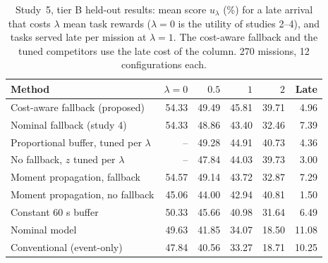 \begin{table}[t]
\caption{Study~5, tier B held-out results: mean score $u_\lambda$ (\%) for a late arrival that costs $\lambda$ mean task rewards ($\lambda = 0$ is the utility of studies 2--4), and tasks served late per mission at $\lambda = 1$. The cost-aware fallback and the tuned competitors use the late cost of the column. 270 missions, 12 configurations each.}\label{tab:s5}
\centering\small
\begin{tabular}{lrrrrr}
\toprule
Method & $\lambda = 0$ & $0.5$ & $1$ & $2$ & Late \\
\midrule
Cost-aware fallback (proposed) & 54.33 & 49.49 & 45.81 & 39.71 & 4.96 \\
Nominal fallback (study 4) & 54.33 & 48.86 & 43.40 & 32.46 & 7.39 \\
Proportional buffer, tuned per $\lambda$ & -- & 49.28 & 44.91 & 40.73 & 4.36 \\
No fallback, $z$ tuned per $\lambda$ & -- & 47.84 & 44.03 & 39.73 & 3.00 \\
Moment propagation, fallback & 54.57 & 49.14 & 43.72 & 32.87 & 7.29 \\
Moment propagation, no fallback & 45.06 & 44.00 & 42.94 & 40.81 & 1.50 \\
Constant 60 s buffer & 50.33 & 45.66 & 40.98 & 31.64 & 6.49 \\
Nominal model & 49.63 & 41.85 & 34.07 & 18.50 & 11.08 \\
Conventional (event-only) & 47.84 & 40.56 & 33.27 & 18.71 & 10.25 \\
\bottomrule
\end{tabular}
\end{table}
